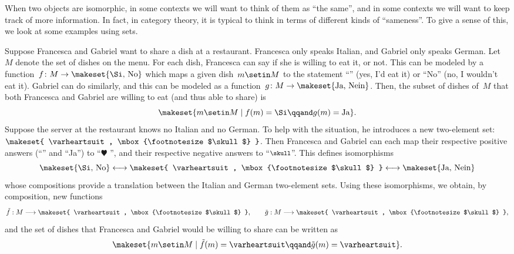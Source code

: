 When two objects are isomorphic, in some contexts we will want to think of them as ``the same'', and in some contexts we will want to keep track of more information.
In fact, in category theory, it is typical to think in terms of different kinds of ``sameness''.
To give a sense of this, we look at some examples using sets.

\begin{example}
    Suppose Francesca and Gabriel want to share a dish at a restaurant.
    Francesca only speaks Italian, and Gabriel only speaks German.
    Let~$M$ denote the set of dishes on the menu.
    For each dish, Francesca can say if she is willing to eat it, or not.
    This can be modeled by a function~$f\colon M \to \makeset{ \text{\Si, No} }$ which maps a given dish~$m \setin M$ to the statement ``\Si'' (yes, I'd eat it) or ``No'' (no, I wouldn't eat it).
    Gabriel can do similarly, and this can be modeled as a function~$g\colon M \to \makeset{ \text{Ja, Nein} }$.
    Then, the subset of dishes of~$M$ that both Francesca and Gabriel are willing to eat (and thus able to share) is
    \begin{equation}
        \makeset{ m \setin M \mid f(m) = \text{\Si} \qqand g(m) = \text{Ja} }.
    \end{equation}
    Suppose the server at the restaurant knows no Italian and no German.
    To help with the situation, he introduces a new two-element set: $\makeset{ \varheartsuit, \mbox{\footnotesize $\skull$} }$.
    Then Francesca and Gabriel can each map their respective positive answers (``\Si'' and ``Ja'') to ``$\varheartsuit$ '', and their respective negative answers to ``$\mbox{\footnotesize $\skull$}$''.
    This defines isomorphisms
    \begin{equation}
        \makeset{ \text{\Si, No} } \longleftrightarrow \makeset{ \varheartsuit, \mbox{\footnotesize $\skull$} } \longleftrightarrow \makeset{ \text{Ja, Nein} }
    \end{equation}
    whose compositions provide a translation between the Italian and German two-element sets.
    Using these isomorphisms, we obtain, by composition, new functions
    \begin{equation}
        \tilde f: M \longrightarrow \makeset{ \varheartsuit, \mbox{\footnotesize $\skull$} }, \qquad \tilde g: M \longrightarrow \makeset{ \varheartsuit, \mbox{\footnotesize $\skull$} },
    \end{equation}
    and the set of dishes that Francesca and Gabriel would be willing to share can be written as
    \begin{equation}
        \makeset{ m \setin M \mid \tilde f(m) = \varheartsuit \qqand \tilde g(m) = \varheartsuit }.
    \end{equation}


\end{example}
